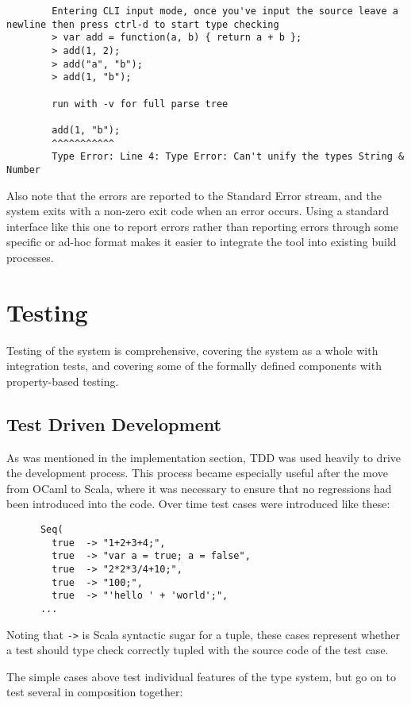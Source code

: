 \documentclass[british, twoside, openright]{bhamthesis}
\theoremstyle{definition}
\begin{document}
      \begin{lstlisting}
        Entering CLI input mode, once you've input the source leave a newline then press ctrl-d to start type checking
        > var add = function(a, b) { return a + b };
        > add(1, 2);
        > add("a", "b");
        > add(1, "b");

        run with -v for full parse tree

        add(1, "b");
        ^^^^^^^^^^^
        Type Error: Line 4: Type Error: Can't unify the types String & Number
      \end{lstlisting}

      Also note that the errors are reported to the Standard Error stream, and the system exits with a non-zero exit code when an error occurs. Using a standard interface like this one to report errors rather than reporting errors through some specific or ad-hoc format makes it easier to integrate the tool into existing build processes.

\chapter{Testing}
  Testing of the system is comprehensive, covering the system as a whole with integration tests, and covering some of the formally defined components with property-based testing.

  \section{Test Driven Development}
    As was mentioned in the implementation section, TDD was used heavily to drive the development process. This process became especially useful after the move from OCaml to Scala, where it was necessary to ensure that no regressions had been introduced into the code. Over time test cases were introduced like these:

    \begin{lstlisting}
      Seq(
        true  -> "1+2+3+4;",
        true  -> "var a = true; a = false",
        true  -> "2*2*3/4+10;",
        true  -> "100;",
        true  -> "'hello ' + 'world';",
      ...
    \end{lstlisting}

    Noting that \texttt{->} is Scala syntactic sugar for a tuple, these cases represent whether a test should type check correctly tupled with the source code of the test case.

    The simple cases above test individual features of the type system, but go on to test several in composition together:
\end{document}
